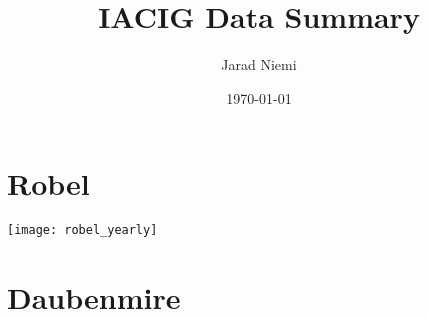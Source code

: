 \documentclass{article}
\title{IACIG Data Summary}
\author{Jarad Niemi}
\date{\today}
\begin{document}
\maketitle

\section{Robel}


\texttt{[image: robel\_yearly]}


\section{Daubenmire}
\end{document}
